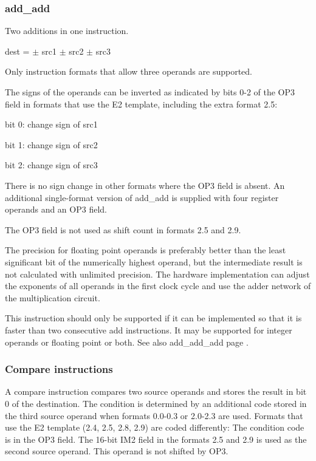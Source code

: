 \documentclass[forwardcom.tex]{subfiles}
\begin{document}
\subsubsection{add\_add}  \label{addAdd}
Two additions in one instruction.
\vspace{2mm}

dest = $\pm$ src1 $\pm$ src2 $\pm$ src3
\vspace{2mm}

Only instruction formats that allow three operands are supported.
\vspace{2mm}

The signs of the operands can be inverted as indicated by bits 0-2 of the OP3 field in formats that use the E2 template, including the extra format 2.5:
\vspace{2mm}

bit 0: change sign of src1

bit 1: change sign of src2

bit 2: change sign of src3
\vspace{2mm}

There is no sign change in other formats where the OP3 field is absent. An additional single-format version of add\_add is supplied with four register operands and an OP3 field.
\vspace{2mm}

The OP3 field is not used as shift count in formats 2.5 and 2.9.
\vspace{2mm}

The precision for floating point operands is preferably better than the least significant bit of the numerically highest operand, but the intermediate result is not calculated with unlimited precision. The hardware implementation can adjust the exponents of all operands in the first clock cycle and use the adder network of the multiplication circuit.
\vspace{2mm}

This instruction should only be supported if it can be implemented so that it is faster than two consecutive add instructions. It may be supported for integer operands or floating point or both. See also add\_add\_add page \pageref{addAddAdd}.

\subsubsection{Compare instructions}
A compare instruction compares two source operands and stores the result in bit 0 of the destination. The condition is determined by an additional code stored in the third source operand when formats 0.0-0.3 or 2.0-2.3 are used. Formats that use the E2 template (2.4, 2.5, 2.8, 2.9) are coded differently: The condition code is in the OP3 field. The 16-bit IM2 field in the formats 2.5 and 2.9 is used as the second source operand. This operand is not shifted by OP3.
\vspace{2mm}
\end{document}
